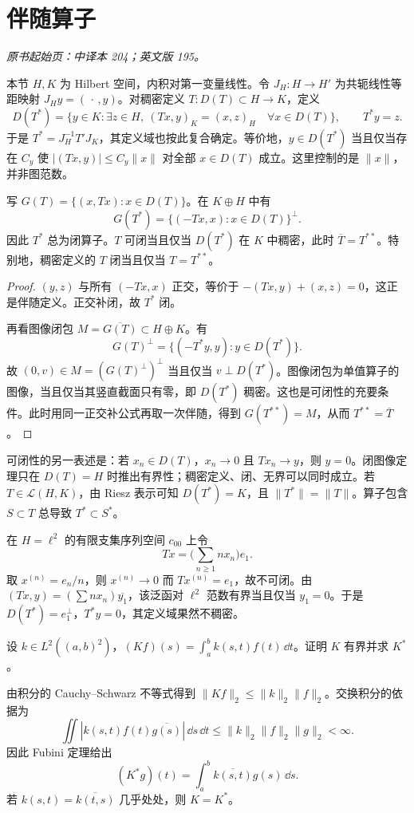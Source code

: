 \section{伴随算子}\label{sec:yosida-07-02}
\noindent\textit{原书起始页：中译本 204；英文版 195。}

本节 $H,K$ 为 Hilbert 空间，内积对第一变量线性。令 $J_H:H\to H'$ 为共轭线性等距映射 $J_Hy=(\,\cdot\,,y)$。对稠密定义 $T:D(T)\subset H\to K$，定义
\[
 D(T^*)=\{y\in K:\exists z\in H,\ (Tx,y)_K=(x,z)_H\quad\forall x\in D(T)\},
 \qquad T^*y=z.
\]
于是 $T^*=J_H^{-1}T'J_K$，其定义域也按此复合确定。等价地，$y\in D(T^*)$ 当且仅当存在 $C_y$ 使 $|(Tx,y)|\le C_y\|x\|$ 对全部 $x\in D(T)$ 成立。这里控制的是 $\|x\|$，并非图范数。

\begin{theorem}[图像、闭性和可闭性]\label{thm:y7-closure}
写 $G(T)=\{(x,Tx):x\in D(T)\}$。在 $K\oplus H$ 中有
\[
 G(T^*)=\{(-Tx,x):x\in D(T)\}^{\perp}.
\]
因此 $T^*$ 总为闭算子。$T$ 可闭当且仅当 $D(T^*)$ 在 $K$ 中稠密，此时 $\overline T=T^{**}$。特别地，稠密定义的 $T$ 闭当且仅当 $T=T^{**}$。
\end{theorem}
\begin{proof}
$(y,z)$ 与所有 $(-Tx,x)$ 正交，等价于 $-(Tx,y)+(x,z)=0$，这正是伴随定义。正交补闭，故 $T^*$ 闭。

再看图像闭包 $M=\overline{G(T)}\subset H\oplus K$。有
\[
 G(T)^\perp=\{(-T^*y,y):y\in D(T^*)\}.
\]
故 $(0,v)\in M=(G(T)^\perp)^\perp$ 当且仅当 $v\perp D(T^*)$。图像闭包为单值算子的图像，当且仅当其竖直截面只有零，即 $D(T^*)$ 稠密。这也是可闭性的充要条件。此时用同一正交补公式再取一次伴随，得到 $G(T^{**})=M$，从而 $T^{**}=\overline T$。
\end{proof}

可闭性的另一表述是：若 $x_n\in D(T)$，$x_n\to0$ 且 $Tx_n\to y$，则 $y=0$。闭图像定理只在 $D(T)=H$ 时推出有界性；稠密定义、闭、无界可以同时成立。若 $T\in\mathcal L(H,K)$，由 Riesz 表示可知 $D(T^*)=K$，且 $\|T^*\|=\|T\|$。算子包含 $S\subset T$ 总导致 $T^*\subset S^*$。

\begin{example}[一个不可闭的稠密定义算子]
在 $H=\ell^2$ 的有限支集序列空间 $c_{00}$ 上令
\[
 Tx=\Big(\sum_{n\ge1}n x_n\Big)e_1.
\]
取 $x^{(n)}=e_n/n$，则 $x^{(n)}\to0$ 而 $Tx^{(n)}=e_1$，故不可闭。由 $(Tx,y)=(\sum n x_n)\overline{y_1}$，该泛函对 $\ell^2$ 范数有界当且仅当 $y_1=0$。于是 $D(T^*)=e_1^\perp$，$T^*y=0$，其定义域果然不稠密。
\end{example}

\begin{exercise}[积分核的伴随]\label{ex:y7-kernel}
设 $k\in L^2((a,b)^2)$，$(Kf)(s)=\int_a^bk(s,t)f(t)\,\dd t$。证明 $K$ 有界并求 $K^*$。
\end{exercise}
\begin{solution}
由积分的 Cauchy--Schwarz 不等式得到 $\|Kf\|_2\le\|k\|_2\|f\|_2$。交换积分的依据为
\[
 \iint|k(s,t)f(t)\overline{g(s)}|\,\dd s\,\dd t
 \le\|k\|_2\|f\|_2\|g\|_2<\infty.
\]
因此 Fubini 定理给出
\[
 (K^*g)(t)=\int_a^b\overline{k(s,t)}g(s)\,\dd s.
\]
若 $k(s,t)=\overline{k(t,s)}$ 几乎处处，则 $K=K^*$。
\end{solution}

